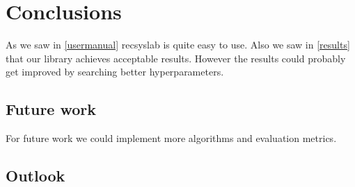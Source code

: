 
\chapter{Conclusions}
As we saw in \ref{usermanual} recsyslab is quite easy to use.
Also we saw in \ref{results} that our library achieves acceptable results.
However the results could probably get improved by searching better 
hyperparameters.


\section{Future work}
For future work we could implement more algorithms and evaluation metrics.



\section{Outlook}
